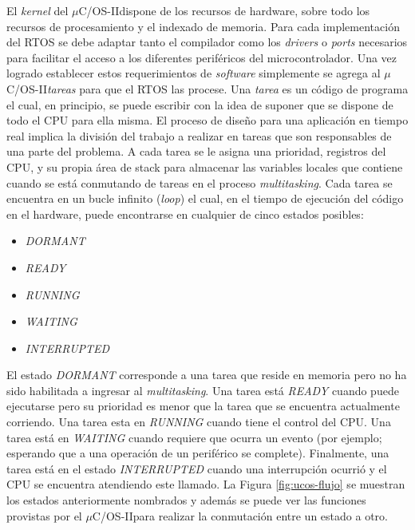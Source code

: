 \documentclass[11pt,a4paper,oneside]{article}
\def\uCOS{$\mu$C/OS-II\texttrademark}
\begin{document}
El \textsl{kernel} del \uCOS dispone de los recursos de hardware, sobre todo los recursos de procesamiento y el indexado de memoria. Para cada implementación del RTOS se debe adaptar tanto el compilador como los \textsl{drivers} o \textsl{ports} necesarios para facilitar el acceso a los diferentes periféricos del microcontrolador. Una vez logrado establecer estos requerimientos de \textsl{software} simplemente se agrega al \uCOS \emph{tareas} para que el RTOS las procese. Una \emph{tarea} es un código de programa el cual, en principio, se puede escribir con la idea de suponer que se dispone de todo el CPU para ella misma. El proceso de diseño para una aplicación en tiempo real implica la división del trabajo a realizar en tareas que son responsables de una parte del problema. A cada tarea se le asigna una prioridad, registros del CPU, y su propia área de stack para almacenar las variables locales que contiene cuando se está conmutando de tareas en el proceso \emph{multitasking}. Cada tarea se encuentra en un bucle infinito (\textsl{loop}) el cual, en el tiempo de ejecución del código en el hardware, puede encontrarse en cualquier de cinco estados posibles:
\begin{itemize}
\item [] \textsl{DORMANT}
\item [] \textsl{READY}
\item [] \textsl{RUNNING}
\item [] \textsl{WAITING}
\item [] \textsl{INTERRUPTED}
\end{itemize}
El estado \textsl{DORMANT} corresponde a una tarea que reside en memoria pero no ha sido habilitada a ingresar al \textsl{multitasking}. Una tarea está \textsl{READY} cuando puede ejecutarse pero su prioridad es menor que la tarea que se encuentra actualmente corriendo. Una tarea esta en \textsl{RUNNING} cuando tiene el control del CPU. Una tarea está en \textsl{WAITING} cuando requiere que ocurra un evento (por ejemplo; esperando que a una operación de un periférico se complete). Finalmente, una tarea está en el estado \textsl{INTERRUPTED} cuando una interrupción ocurrió y el CPU se encuentra atendiendo este llamado. La Figura \ref{fig:ucos-flujo} se muestran los estados anteriormente nombrados y además se puede ver las funciones provistas por el \uCOS para realizar la conmutación entre un estado a otro.
\end{document}
